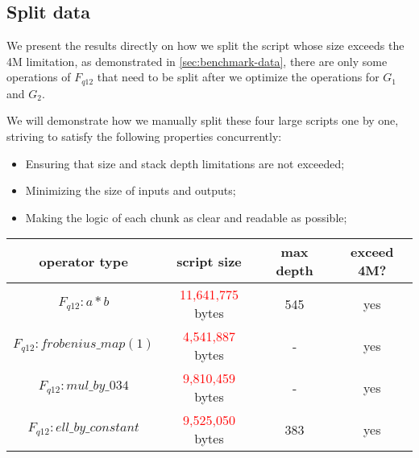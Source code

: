 \subsection{Split data} \label{sec:split-data}

We present the results directly on how we split the script whose size exceeds the 4M limitation, as demonstrated in \ref{sec:benchmark-data},
there are only some operations of $F_{q12}$ that need to be split after we optimize the operations for $G_1$ and $G_2$.

We will demonstrate how we manually split these four large scripts one by one, striving to satisfy the following properties concurrently:

\begin{itemize}
    \item Ensuring that size and stack depth limitations are not exceeded;
    \item Minimizing the size of inputs and outputs;
    \item Making the logic of each chunk as clear and readable as possible; 
\end{itemize}

\begin{center}
\begin{tabular}{|c|c|c|c|} \hline
    operator type & script size & max depth & exceed 4M? \\ \hline
    $F_{q12}: a * b$ & \textcolor{red}{11,641,775} bytes & 545 & yes \\ \hline
    $F_{q12}: frobenius\_map(1)$ & \textcolor{red}{4,541,887} bytes & - & yes \\ \hline
    $F_{q12}: mul\_by\_034$ & \textcolor{red}{9,810,459} bytes & - & yes \\ \hline
    $F_{q12}: ell\_by\_constant$ & \textcolor{red}{9,525,050} bytes & 383 & yes \\ \hline    
\end{tabular}
\end{center}



